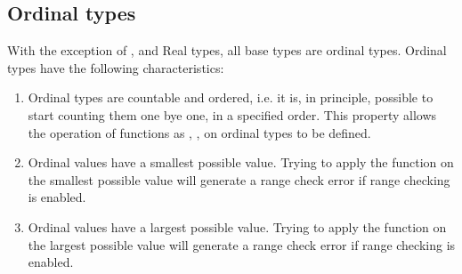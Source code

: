 \subsection{Ordinal types}
With the exception of ,  and Real types, 
all base types are ordinal types. Ordinal types have the following 
characteristics:
\begin{enumerate}
\item Ordinal types are countable and ordered, i.e. it is, in principle,
possible to start counting them one bye one, in a specified order.
This property allows the operation of functions as , ,
on ordinal types to be defined.
\item Ordinal values have a smallest possible value. Trying to apply the
 function on the smallest possible value will generate a range
check error if range checking is enabled.
\item Ordinal values have a largest possible value. Trying to apply the
 function on the largest possible value will generate a range
check error if range checking is enabled.
\end{enumerate}
